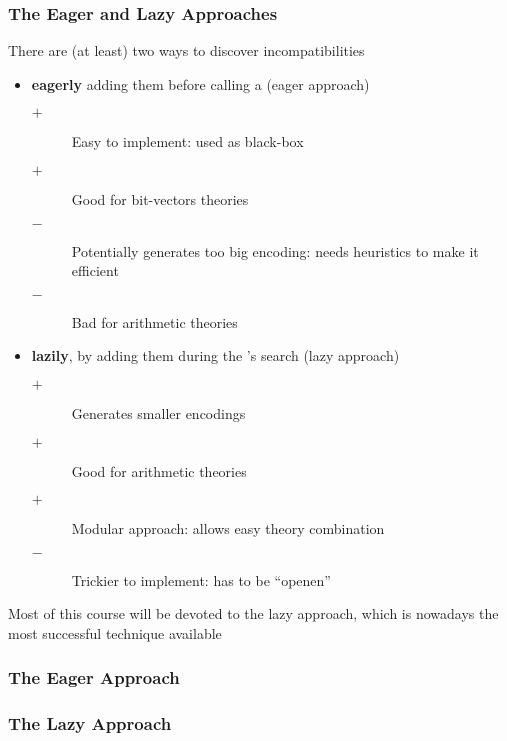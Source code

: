 \begin{frame}
  \frametitle{The Eager and Lazy Approaches}

  There are (at least) two ways to discover incompatibilities
  \begin{itemize}
    \item {\bf eagerly} adding them before calling a \satsolver (eager approach)
	  \begin{description}
	    \item[$+$] Easy to implement: \satsolver used as black-box
	    \item[$+$] Good for bit-vectors theories
	    \item[$-$] Potentially generates too big encoding: needs heuristics
	               to make it efficient
	    \item[$-$] Bad for arithmetic theories
	  \end{description} \pause
    \item {\bf lazily}, by adding them during the \satsolver's search (lazy approach)
	  \begin{description}
	    \item[$+$] Generates smaller encodings
	    \item[$+$] Good for arithmetic theories
	    \item[$+$] Modular approach: allows easy theory combination
	    \item[$-$] Trickier to implement: \satsolver has to be ``openen''
	  \end{description}
  \end{itemize}
  \vfill
  \pause
  Most of this course will be devoted to the lazy approach, 
  which is nowadays the most successful technique available

\end{frame}

\begin{frame}
  \frametitle{The Eager Approach}

  \begin{center}
  \scalebox{.5}{}
  \end{center}

\end{frame}

\begin{frame}
  \frametitle{The Lazy Approach}

  \begin{center}
  \scalebox{.5}{}
  \end{center}

\end{frame}

